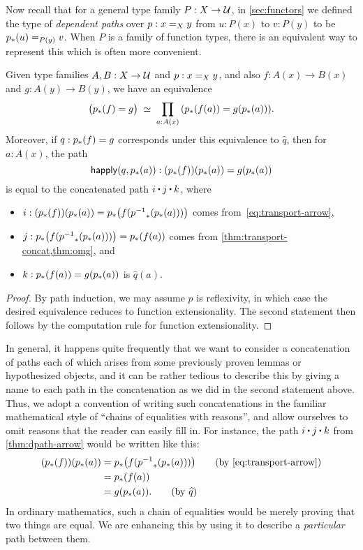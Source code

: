 Now recall that for a general type family $P:X\to\type$, in \cref{sec:functors} we defined the type of \emph{dependent paths} over $p:\id[X]xy$ from $u:P(x)$ to $v:P(y)$ to be $\id[P(y)]{\trans{p}{u}}{v}$.
When $P$ is a family of function types, there is an equivalent way to represent this which is often more convenient.

\begin{lem}\label{thm:dpath-arrow}
  Given type families $A,B:X\to\type$ and $p:\id[X]xy$, and also $f:A(x)\to B(x)$ and $g:A(y)\to B(y)$, we have an equivalence
  \[ \eqvspaced{ \big(\trans{p}{f} = {g}\big) } { \prd{a:A(x)}  (\trans{p}{f(a)} = g(\trans{p}{a})) }. \]
  Moreover, if $q:\trans{p}{f} = {g}$ corresponds under this equivalence to $\widehat q$, then for $a:A(x)$, the path
  \[ \happly(q,\trans p a) : (\trans p f)(\trans p a) = g(\trans p a)\]
  is equal to the concatenated path $i\ct j\ct k$, where
  \begin{itemize}
  \item $i:(\trans p f)(\trans p a) = \trans p {f (\trans {\opp p}{\trans p a})}$ comes from~\eqref{eq:transport-arrow},
  \item $j:\trans p {f (\trans {\opp p}{\trans p a})} = \trans p {f(a)}$ comes from \cref{thm:transport-concat,thm:omg}, and
  \item $k:\trans p {f(a)}= g(\trans p a)$ is $\widehat{q}(a)$.
  \end{itemize}
\end{lem}
\begin{proof}
  By path induction, we may assume $p$ is reflexivity, in which case the desired equivalence reduces to function extensionality.
  The second statement then follows by the computation rule for function extensionality.
\end{proof}

In general, it happens quite frequently that we want to consider a concatenation of paths each of which arises from some previously proven lemmas or hypothesized objects, and it can be rather tedious to describe this by giving a name to each path in the concatenation as we did in the second statement above.
Thus, we adopt a convention of writing such concatenations in the familiar mathematical style of ``chains of equalities with reasons'', and allow ourselves to omit reasons that the reader can easily fill in.
For instance, the path $i\ct j\ct k$ from \cref{thm:dpath-arrow} would be written like this:
  \begin{align*}
    (\trans p f)(\trans p a)
    &= \trans p {f (\trans {\opp p}{\trans p a})}
    \tag{by~\eqref{eq:transport-arrow}}\\
    &= \trans p {f(a)}\\
    &= g(\trans p a).
    \tag{by $\widehat{q}$}
  \end{align*}
In ordinary mathematics, such a chain of equalities would be merely proving that two things are equal.
We are enhancing this by using it to describe a \emph{particular} path between them.

